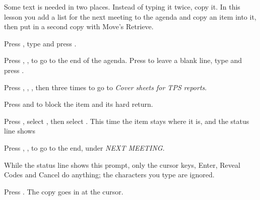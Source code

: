 Some text is needed in two places.  Instead of typing it twice, copy it.
In this lesson you add a list for the next meeting to the agenda and copy
an item into it, then put in a second copy with Move's Retrieve.

\begin{WPSteps}
\item Press , type  and press
.
\item Press , ,  to go to the
end of the agenda.  Press  to leave a blank line, type
 and press .
\end{WPSteps}

\begin{WPSteps}
\item Press , , , then
 three times to go to \textit{Cover sheets for TPS
reports}.
\item Press  and  to block the item and
its hard return.
\item Press , select , then select
.  This time the item stays where it is, and the status line
shows 
\item Press , ,  to go to the
end, under \textit{NEXT MEETING}.
\end{WPSteps}
\begin{Aside}While the status line shows this prompt, only the cursor keys,
Enter, Reveal Codes and Cancel do anything; the characters you type are
ignored.\end{Aside}
\begin{WPSteps}[resume]
\item Press .  The copy goes in at the cursor.
\end{WPSteps}

